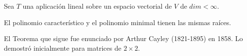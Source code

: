\begin{theorem}

\label{Teorema10}
Sea $T$ una aplicación lineal sobre un espacio vectorial de $V$ de $dim<\infty$. 

El polinomio característico y el polinomio minimal tienen las mismas raíces.


\end{theorem}

\bigskip

El Teorema que sigue fue enunciado por Arthur Cayley (1821-1895) en 1858. Lo demostró inicialmente  para matrices de $2 \times 2$. 

\bigskip

\bigskip


